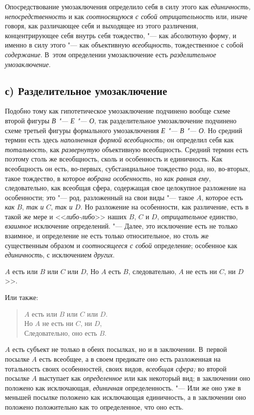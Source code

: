 Опосредствование умозаключения определило себя в силу этого
как {\em единичность, непосредственность} и
как {\em соотносящуюся с собой
отрицательность} или, иначе говоря, как различающее себя и
выходящее из этого различения, концентрирующее себя внутрь себя тождество,
"--- как абсолютную форму, и именно в силу этого "--- как объективную
{\em всеобщность}, тождественное с собой {\em содержание}. В~этом
определении умозаключение есть {\em разделительное умозаключение}.

\subsection[с) Разделительное умозаключение]{с) Разделительное умозаключение}

Подобно тому как гипотетическое умозаключение подчинено вообще
схеме второй фигуры {\em В "--- Е "--- О}, так разделительное
умозаключение подчинено схеме третьей фигуры формального умозаключения
{\em Е "--- В "--- О}. Но средний термин есть здесь
{\em наполненная формой всеобщность;}
он определил себя как {\em тотальность}, как {\em развернутую}
объективную всеобщность. Средний термин есть поэтому столь же
всеобщность, сколь и особенность и единичность. Как всеобщность он есть,
во-первых, субстанциальное тождество рода, но, во-вторых, такое тождество,
в которое {\em вобрана особенность}, но {\em как равная ему},
следовательно, как всеобщая сфера, содержащая свое целокупное
разложение на особенности; это "--- род, разложенный на свои
виды "--- такое $A$,
которое есть {\em как} $B$, {\em так и} $C$, {\em так и} $D$. Но
разложение на особенности, как различение, есть в такой же мере и
<<{\em либо-либо}>> наших $B$, $C$ и $D$, {\em отрицательное}
единство, {\em взаимное} исключение определений. "--- Далее, это
исключение есть не только взаимное, и определение не есть только
относительное, но столь же существенным образом и {\em соотносящееся с собой}
определение; особенное как {\em единичность}, с исключением {\em других}.

$A$ есть или $B$ или $C$ или $D$,
Но $A$ есть $B$, следовательно, $A$ не есть ни $C$, ни $D$>>.

Или также:

\begin{verse}
$A$ есть или $B$ или $C$ или $D$.\\
Но $A$ не есть ни $C$, ни $D$,\\
Следовательно, оно есть $B$.
\end{verse}

$A$ есть субъект не только в обеих посылках, но и в заключении.
В~первой посылке $A$ есть всеобщее, а
в своем предикате оно есть разложенная на тотальность своих особенностей,
своих видов, {\em всеобщая сфера;} во второй посылке $A$
выступает как {\em определенное} или
как некоторый вид; в заключении оно положено как исключающая, {\em единичная}
определенность. "--- Или же оно уже в меньшей
посылке положено как исключающая единичность, а в заключении оно положено
положительно как то определенное, что оно есть.

